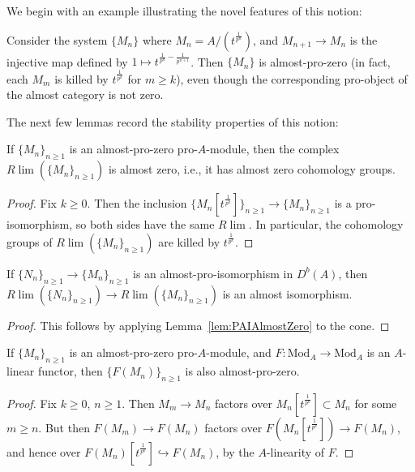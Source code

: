 \documentclass[10pt,reqno]{amsart}
\begin{document}
We begin with an example illustrating the novel features of this notion:

\begin{example}
Consider the system $\{M_n\}$ where $M_n = A/(t^{\frac{1}{p^n}})$, and $M_{n+1} \to M_n$ is the injective map defined by $1 \mapsto t^{\frac{1}{p^n} - \frac{1}{p^{n+1}}}$. Then $\{M_n\}$ is almost-pro-zero (in fact, each $M_m$ is killed by $t^{\frac{1}{p^k}}$ for $m \geq k$), even though the corresponding pro-object of the almost category is not zero.
\end{example}

The next few lemmas record the stability properties of this notion:

\begin{lemma}
\label{lem:PAIAlmostZero}
If $\{M_n\}_{n \geq 1}$ is an almost-pro-zero pro-$A$-module, then the complex $R\lim(\{M_n\}_{n \geq 1})$ is almost zero, i.e., it has almost zero cohomology groups. 
\end{lemma}
\begin{proof}
Fix  $k \geq 0$. Then the inclusion $\{M_n[t^{\frac{1}{p^k}}]\}_{n \geq 1} \to \{M_n\}_{n \geq 1}$ is a pro-isomorphism, so both sides have the same $R\lim$. In particular, the cohomology groups of $R\lim(\{M_n\}_{n \geq 1})$ are killed by $t^{\frac{1}{p^k}}$.
\end{proof}


\begin{lemma}
\label{lem:PAIAlmostIso}
If $\{N_n\}_{n \geq 1} \to \{M_n\}_{n \geq 1}$ is an almost-pro-isomorphism in $D^b(A)$, then $R\lim(\{N_n\}_{n \geq 1}) \to R\lim(\{M_n\}_{n \geq 1})$ is an almost isomorphism.
\end{lemma}
\begin{proof}
This follows by applying Lemma~\ref{lem:PAIAlmostZero} to the cone.
\end{proof}


\begin{lemma}
\label{lem:PAIAlinear}
If $\{M_n\}_{n \geq 1}$ is an almost-pro-zero pro-$A$-module, and $F:\mathrm{Mod}_A \to \mathrm{Mod}_A$ is an $A$-linear functor, then $\{F(M_n)\}_{n \geq 1}$ is also almost-pro-zero.
\end{lemma}
\begin{proof}
Fix  $k \geq 0$, $n \geq 1$. Then $M_m \to M_n$ factors over $M_n[t^{\frac{1}{p^k}}] \subset M_n$ for some $m \geq n$. But then $F(M_m) \to F(M_n)$ factors over $F(M_n[t^{\frac{1}{p^k}}]) \to F(M_n)$, and hence over $F(M_n)[t^{\frac{1}{p^k}}] \hookrightarrow F(M_n)$, by the $A$-linearity of $F$. 
\end{proof}
\end{document}
